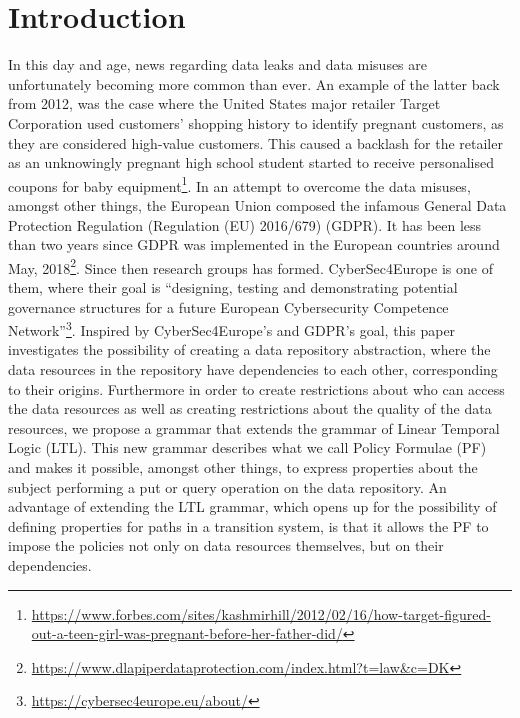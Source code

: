 \section{Introduction}
In this day and age, news regarding data leaks and data misuses are unfortunately becoming more common than ever. An example of the latter back from 2012, was the case where the United States major retailer Target Corporation used customers' shopping history to identify pregnant customers, as they are considered high-value customers. This caused a backlash for the retailer as an unknowingly pregnant high school student started to receive personalised coupons for baby equipment\footnote{\url{https://www.forbes.com/sites/kashmirhill/2012/02/16/how-target-figured-out-a-teen-girl-was-pregnant-before-her-father-did/}}. In an attempt to overcome the data misuses, amongst other things, the European Union composed the infamous General Data Protection Regulation (Regulation (EU) 2016/679) (GDPR). It has been less than two years since GDPR was implemented in the European countries around May, 2018\footnote{\url{https://www.dlapiperdataprotection.com/index.html?t=law&c=DK}}. Since then research groups has formed. CyberSec4Europe is one of them, where their goal is ``designing, testing and demonstrating potential governance structures for a future European Cybersecurity Competence Network''\footnote{\url{https://cybersec4europe.eu/about/}}. Inspired by CyberSec4Europe's and GDPR's goal, this paper investigates the possibility of creating a data repository abstraction, where the data resources in the repository have dependencies to each other, corresponding to their origins. Furthermore in order to create restrictions about who can access the data resources as well as creating restrictions about the quality of the data resources, we propose a grammar that extends the grammar of Linear Temporal Logic (LTL). This new grammar describes what we call Policy Formulae (PF) and makes it possible, amongst other things, to express properties about the subject performing a put or query operation on the data repository. An advantage of extending the LTL grammar, which opens up for the possibility of defining properties for paths in a transition system, is that it allows the PF to impose the policies not only on data resources themselves, but on their dependencies.


